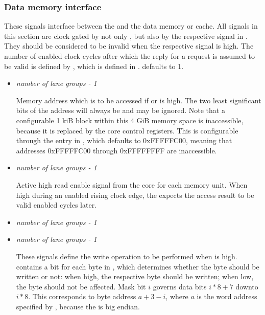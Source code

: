 
\subsubsection{Data memory interface}
\label{sec:core-ug-cfg-inst-port-dmem}

These signals interface between the \rvex{} and the data memory or cache. All 
signals in this section are clock gated by not only , but also by 
the respective signal in . They should be considered to be 
invalid when the respective  signal is high. The number of 
enabled clock cycles after which the reply for a request is assumed to be valid 
is defined by , which is defined in . 
 defaults to 1.

\begin{itemize}
  
\item {}\textit{number of lane groups - 1}

Memory address which is to be accessed if  or 
 is high. The two least significant bits of the 
address will always be  and may be ignored. Note that a configurable 
1 kiB block within this 4 GiB memory space is inaccessible, because it is 
replaced by the core control registers. This is configurable through the 
 entry in , which defaults to 0xFFFFFC00, 
meaning that addresses 0xFFFFFC00 through 0xFFFFFFFF are inaccessible.

\vspace{1em}
\item {}\textit{number of lane groups - 1}

Active high read enable signal from the core for each memory unit. When high 
during an enabled rising clock edge, the \rvex{} expects the access result to be 
valid  enabled cycles later.

\vspace{1em}
\item {}\textit{number of lane groups - 1}
\item {}\textit{number of lane groups - 1}

These signals define the write operation to be performed when 
 is high.  contains a bit for 
each byte in , which determines whether the byte should 
be written or not: when high, the respective byte should be written; when low, 
the byte should not be affected. Mask bit $i$ governs data bits $i*8+7$ downto 
$i*8$. This corresponds to byte address $a + 3 - i$, where $a$ is the word
address specified by , because the \rvex{} is big endian.


\end{itemize}
